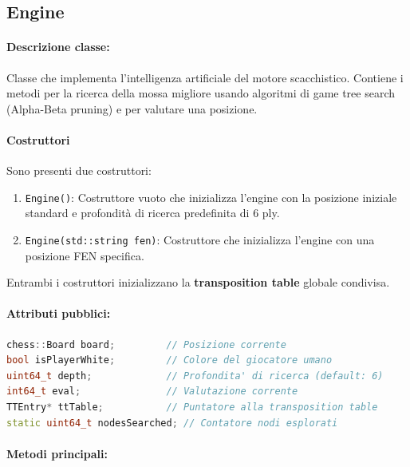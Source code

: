 \subsection{Engine}
\paragraph{Descrizione classe:}
Classe che implementa l'intelligenza artificiale del motore scacchistico.
Contiene i metodi per la ricerca della mossa migliore usando algoritmi
di game tree search (Alpha-Beta pruning) e per valutare una posizione.

\paragraph{Costruttori}
Sono presenti due costruttori:

\begin{enumerate}
  \item \texttt{Engine()}: Costruttore vuoto che inizializza l'engine con la posizione iniziale standard
        e profondità di ricerca predefinita di 6 ply.
  \item \texttt{Engine(std::string fen)}: Costruttore che inizializza l'engine con una posizione FEN specifica.
\end{enumerate}

Entrambi i costruttori inizializzano la \textbf{transposition table} globale condivisa.

\paragraph{Attributi pubblici:}
\begin{lstlisting}[language=C++]
chess::Board board;         // Posizione corrente
bool isPlayerWhite;         // Colore del giocatore umano
uint64_t depth;             // Profondita' di ricerca (default: 6)
int64_t eval;               // Valutazione corrente
TTEntry* ttTable;           // Puntatore alla transposition table
static uint64_t nodesSearched; // Contatore nodi esplorati
\end{lstlisting}

\paragraph{Metodi principali:}

